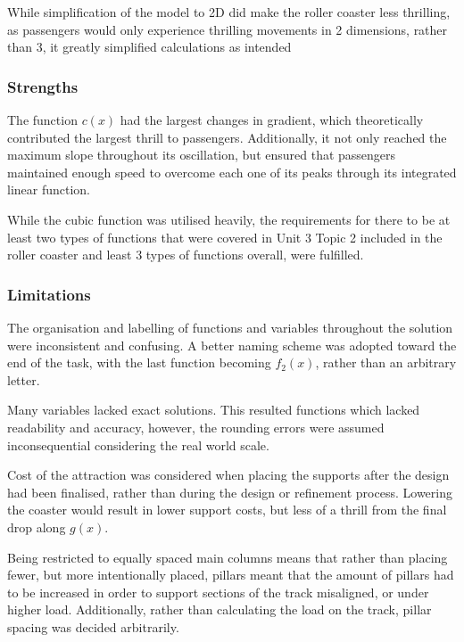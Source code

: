 \documentclass[11pt, letterpaper]{article}
\begin{document}
While simplification of the model to 2D did make the roller coaster less thrilling, as passengers would only experience thrilling movements in 2 dimensions, rather than 3, it greatly simplified calculations as intended


\subsubsection{Strengths}


The function $c(x)$ had the largest changes in gradient, which theoretically contributed the largest thrill to passengers. Additionally, it not only reached the maximum slope throughout its oscillation, but ensured that passengers maintained enough speed to overcome each one of its peaks through its integrated linear function.

While the cubic function was utilised heavily, the requirements for there to be at least two types of functions that were covered in Unit 3 Topic 2 included in the roller coaster and least 3 types of functions overall, were fulfilled.



\subsubsection{Limitations}


The organisation and labelling of functions and variables throughout the solution were inconsistent and confusing. A better naming scheme was adopted toward the end of the task, with the last function becoming $f_2(x)$, rather than an arbitrary letter. 

Many variables lacked exact solutions. This resulted functions which lacked readability and accuracy, however, the rounding errors were assumed inconsequential considering the real world scale.

Cost of the attraction was considered when placing the supports after the design had been finalised, rather than during the design or refinement process. Lowering the coaster would result in lower support costs, but less of a thrill from the final drop along $g(x)$. 

Being restricted to equally spaced main columns means that rather than placing fewer, but more intentionally placed, pillars meant that the amount of pillars had to be increased in order to support sections of the track misaligned, or under higher load. Additionally, rather than calculating the load on the track, pillar spacing was decided arbitrarily.
\end{document}
